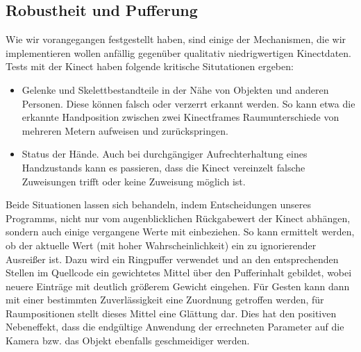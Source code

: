 	\subsection{Robustheit und Pufferung}\label{sec:robustheit}
	Wie wir vorangegangen festgestellt haben, sind einige der Mechanismen, die wir implementieren wollen anfällig gegenüber qualitativ niedrigwertigen Kinectdaten. Tests mit der Kinect haben folgende kritische Situtationen ergeben:
	\begin{itemize}
		\item Gelenke und Skelettbestandteile in der Nähe von Objekten und anderen Personen. Diese können falsch oder verzerrt erkannt werden. So kann etwa die erkannte Handposition zwischen zwei Kinectframes Raumunterschiede von mehreren Metern aufweisen und zurückspringen.
		\item Status der Hände. Auch bei durchgängiger Aufrechterhaltung eines Handzustands kann es passieren, dass die Kinect vereinzelt falsche Zuweisungen trifft oder keine Zuweisung möglich ist.
	\end{itemize}
	Beide Situationen lassen sich behandeln, indem Entscheidungen unseres Programms, nicht nur vom augenblicklichen Rückgabewert der Kinect abhängen, sondern auch einige vergangene Werte mit einbeziehen. So kann ermittelt werden, ob der aktuelle Wert (mit hoher Wahrscheinlichkeit) ein zu ignorierender Ausreißer ist. Dazu wird ein Ringpuffer verwendet und an den entsprechenden Stellen im Quellcode ein gewichtetes Mittel über den Pufferinhalt gebildet, wobei neuere Einträge mit deutlich größerem Gewicht eingehen. Für Gesten kann dann mit einer bestimmten Zuverlässigkeit eine Zuordnung getroffen werden, für Raumpositionen stellt dieses Mittel eine Glättung dar. Dies hat den positiven Nebeneffekt, dass die endgültige Anwendung der errechneten Parameter auf die Kamera bzw. das Objekt ebenfalls geschmeidiger werden.